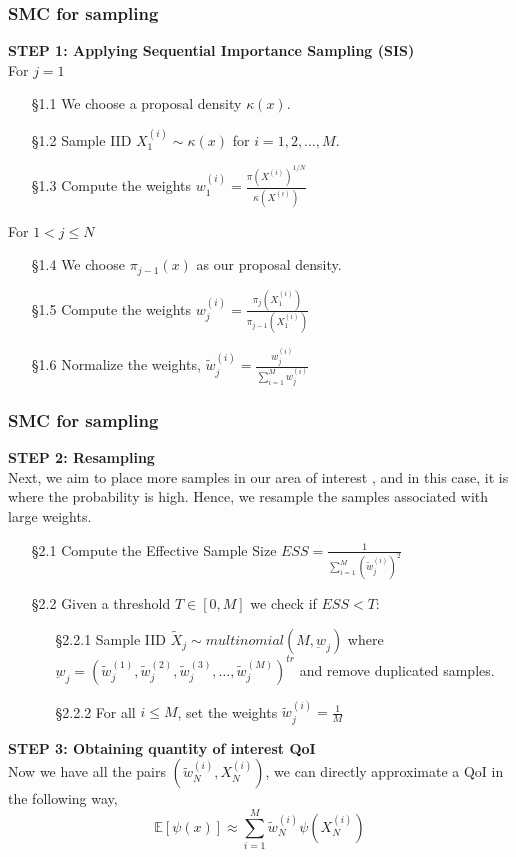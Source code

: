 \documentclass[aspectratio=169]{beamer}\usepackage[utf8]{inputenc}
\newcommand{\E}{\mathbb{E}}
\begin{document}
\begin{frame}\frametitle{SMC for sampling }
\textbf{ STEP 1: Applying Sequential Importance Sampling  (SIS)}\\
For $j=1$
\begin{enumerate}
\item[§1.1]  We choose a proposal density   $\kappa (x) $.
\item[§1.2] Sample IID $X_1^{(i)} \sim\kappa (x)$  for $i =1,2,\ldots, M$.
\item[§1.3] Compute the weights $w^{(i)}_1= \frac{ \pi (X^{(i)})^{1/N}}{\kappa (X^{(i)}) }$\\
\end{enumerate}
For $ 1 < j \leq N  $
\begin{enumerate}
\item[§1.4]  We choose  $\pi_{j-1}(x)$  as our  proposal density.
\item[§1.5] Compute the weights $w^{(i)}_j= \frac{\pi_{j}(X_1^{(i)})}{\pi_{j-1}(X_1^{(i)})}$
\item[§1.6] Normalize the weights, $\tilde{w}^{(i)}_j = \frac{w^{(i)}_j}{\sum_{i=1}^M w^{(i)}_j}$ 
\end{enumerate}
\end{frame}

\begin{frame}\frametitle{SMC for sampling }
\textbf{STEP 2: Resampling }\\
Next,  we aim to place more samples in our area of interest , and in this case, it is  where the  probability is high. Hence, we resample the samples  associated with large weights.\\
\begin{enumerate}
\item[§2.1] Compute the Effective Sample Size $ESS= \frac{1}{\sum_{i=1}^M (\tilde{w}^{(i)}_j )^2 }$ 
\item [§2.2] Given a threshold $T \in [0,M]$ we check if $ESS < T$: 
\begin{enumerate}
\item[§2.2.1]  Sample IID $\tilde{X}_j  \sim  multinomial(M,\underbar{w}_j)$  where $\underbar{w}_j=(\tilde{w}^{(1)}_j , \tilde{w}^{(2)}_j ,\tilde{w}^{(3)}_j ,\ldots, \tilde{w}^{(M)}_j )^{tr} $ and remove duplicated samples.
\item[§2.2.2]  For all $i \leq M$, set the weights $ \tilde{w}_j^{(i)} = \frac{1}{M} $
\end{enumerate}
\end{enumerate}
\textbf{STEP 3: Obtaining quantity of interest  QoI }\\
Now we have all the pairs $(\tilde{w}_N^{(i)},X_N^{(i)} )$, we can directly approximate a  QoI  in the following way, 
\begin{equation}
\E [ \psi (x)] \approx \sum_{i=1}^M \tilde{w}_N^{(i)}  \psi (X_N^{(i)})
\end{equation}

\end{frame}
\end{document}
